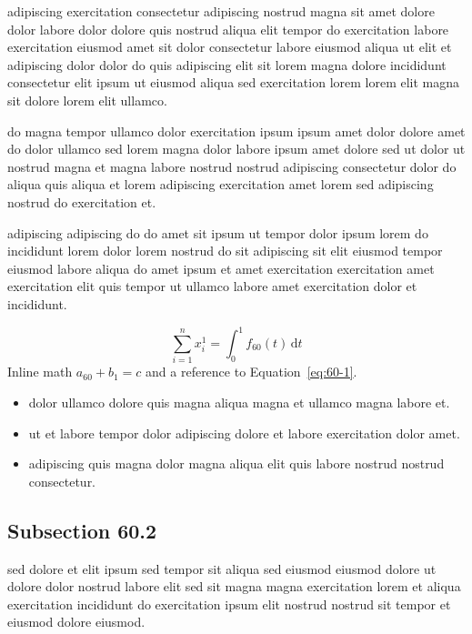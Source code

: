 \documentclass{article}
\begin{document}
adipiscing exercitation consectetur adipiscing nostrud magna sit amet dolore dolor labore dolor dolore quis nostrud aliqua elit tempor do exercitation labore exercitation eiusmod amet sit dolor consectetur labore eiusmod aliqua ut elit et adipiscing dolor dolor do quis adipiscing elit sit lorem magna dolore incididunt consectetur elit ipsum ut eiusmod aliqua sed exercitation lorem lorem elit magna sit dolore lorem elit ullamco.

do magna tempor ullamco dolor exercitation ipsum ipsum amet dolor dolore amet do dolor ullamco sed lorem magna dolor labore ipsum amet dolore sed ut dolor ut nostrud magna et magna labore nostrud nostrud adipiscing consectetur dolor do aliqua quis aliqua et lorem adipiscing exercitation amet lorem sed adipiscing nostrud do exercitation et.

adipiscing adipiscing do do amet sit ipsum ut tempor dolor ipsum lorem do incididunt lorem dolor lorem nostrud do sit adipiscing sit elit eiusmod tempor eiusmod labore aliqua do amet ipsum et amet exercitation exercitation amet exercitation elit quis tempor ut ullamco labore amet exercitation dolor et incididunt.

\begin{equation}\label{eq:60-1}
  \sum_{i=1}^{n} x_i^{1} = \int_0^1 f_{60}(t)\,\mathrm{d}t
\end{equation}
Inline math $a_{60} + b_{1} = c$ and a reference to Equation~\eqref{eq:60-1}.

\begin{itemize}
  \item dolor ullamco dolore quis magna aliqua magna et ullamco magna labore et.
  \item ut et labore tempor dolor adipiscing dolore et labore exercitation dolor amet.
  \item adipiscing quis magna dolor magna aliqua elit quis labore nostrud nostrud consectetur.
\end{itemize}

\subsection{Subsection 60.2}\label{sec:60-2}
sed dolore et elit ipsum sed tempor sit aliqua sed eiusmod eiusmod dolore ut dolore dolor nostrud labore elit sed sit magna magna exercitation lorem et aliqua exercitation incididunt do exercitation ipsum elit nostrud nostrud sit tempor et eiusmod dolore eiusmod.
\end{document}
